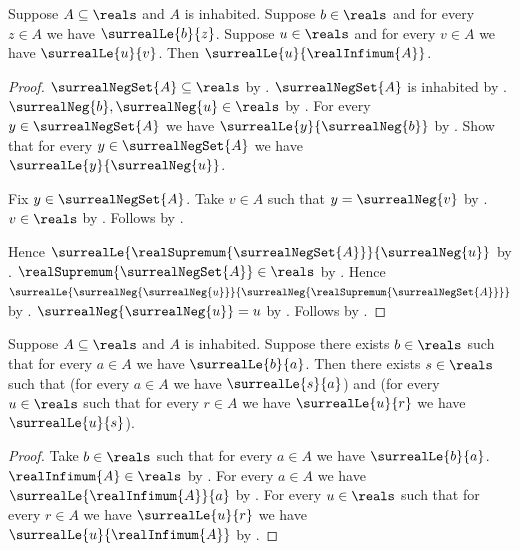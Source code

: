 \begin{theorem}\label{real_infimum_greatest}
    Suppose $A\subseteq\reals$ and $A$ is inhabited.
    Suppose $b\in\reals$ and for every $z\in A$ we have
        $\surrealLe{b}{z}$.
    Suppose $u\in\reals$ and for every $v\in A$ we have
        $\surrealLe{u}{v}$.
    Then $\surrealLe{u}{\realInfimum{A}}$.
\end{theorem}
\begin{proof}
    $\surrealNegSet{A}\subseteq\reals$ by
        .
    $\surrealNegSet{A}$ is inhabited by
        .
    $\surrealNeg{b},\surrealNeg{u}\in\reals$ by
        .
    For every $y\in\surrealNegSet{A}$ we have
        $\surrealLe{y}{\surrealNeg{b}}$ by
        .
    Show that for every $y\in\surrealNegSet{A}$ we have
        $\surrealLe{y}{\surrealNeg{u}}$.
    \begin{subproof}
        Fix $y\in\surrealNegSet{A}$.
        Take $v\in A$ such that $y=\surrealNeg{v}$ by
            .
        $v\in\reals$ by .
        Follows by
            .
    \end{subproof}
    Hence $\surrealLe{\realSupremum{\surrealNegSet{A}}}
        {\surrealNeg{u}}$ by
        .
    $\realSupremum{\surrealNegSet{A}}\in\reals$ by
        .
    Hence $\surrealLe{\surrealNeg{\surrealNeg{u}}}
        {\surrealNeg{\realSupremum{\surrealNegSet{A}}}}$ by
        .
    $\surrealNeg{\surrealNeg{u}}=u$ by
        .
    Follows by .
\end{proof}

\begin{theorem}\label{surreal_reals_greatest_lower_bound}
    Suppose $A\subseteq\reals$ and $A$ is inhabited.
    Suppose there exists $b\in\reals$ such that for every $a\in A$
        we have $\surrealLe{b}{a}$.
    Then there exists $s\in\reals$ such that
        (for every $a\in A$ we have $\surrealLe{s}{a}$) and
        (for every $u\in\reals$ such that for every $r\in A$ we have
            $\surrealLe{u}{r}$ we have $\surrealLe{u}{s}$).
\end{theorem}
\begin{proof}
    Take $b\in\reals$ such that for every $a\in A$ we have
        $\surrealLe{b}{a}$.
    $\realInfimum{A}\in\reals$ by .
    For every $a\in A$ we have $\surrealLe{\realInfimum{A}}{a}$ by
        .
    For every $u\in\reals$ such that for every $r\in A$ we have
        $\surrealLe{u}{r}$ we have
        $\surrealLe{u}{\realInfimum{A}}$ by
        .
\end{proof}
